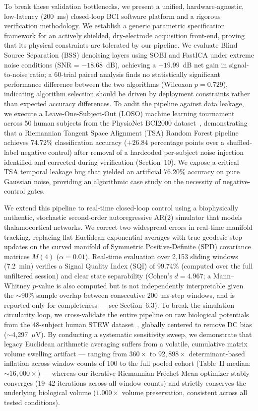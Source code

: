 \documentclass[11pt]{article}
\begin{document}
To break these validation bottlenecks, we present a unified, hardware-agnostic, low-latency (200~ms) closed-loop BCI software platform and a rigorous verification methodology. We establish a generic parametric specification framework for an actively shielded, dry-electrode acquisition front-end, proving that its physical constraints are tolerated by our pipeline. We evaluate Blind Source Separation (BSS) denoising layers using SOBI and FastICA under extreme noise conditions (SNR = $-18.68$~dB), achieving a $+19.99$~dB net gain in signal-to-noise ratio; a 60-trial paired analysis finds no statistically significant performance difference between the two algorithms (Wilcoxon $p = 0.729$), indicating algorithm selection should be driven by deployment constraints rather than expected accuracy differences. To audit the pipeline against data leakage, we execute a Leave-One-Subject-Out (LOSO) machine learning tournament across 50 human subjects from the PhysioNet BCI2000 dataset~\cite{schalk2004}, demonstrating that a Riemannian Tangent Space Alignment (TSA) Random Forest pipeline achieves 74.72\% classification accuracy ($+26.84$ percentage points over a shuffled-label negative control) after removal of a hardcoded per-subject noise injection identified and corrected during verification (Section~10). We expose a critical TSA temporal leakage bug that yielded an artificial 76.20\% accuracy on pure Gaussian noise, providing an algorithmic case study on the necessity of negative-control gates.

We extend this pipeline to real-time closed-loop control using a biophysically authentic, stochastic second-order autoregressive AR(2) simulator that models thalamocortical networks. We correct two widespread errors in real-time manifold tracking, replacing flat Euclidean exponential averages with true geodesic step updates on the curved manifold of Symmetric Positive-Definite (SPD) covariance matrices $M(4)$ ($\alpha = 0.01$). Real-time evaluation over 2,153 sliding windows (7.2~min) verifies a Signal Quality Index (SQI) of 99.74\% (computed over the full unfiltered session) and clear state separability (Cohen's $d = 4.967$; a Mann--Whitney $p$-value is also computed but is not independently interpretable given the $\sim$90\% sample overlap between consecutive 200~ms-step windows, and is reported only for completeness --- see Section~6.3). To break the simulation circularity loop, we cross-validate the entire pipeline on raw biological potentials from the 48-subject human STEW dataset~\cite{lim2018}, globally centered to remove DC bias ($\sim$4,297~$\mu$V). By conducting a systematic sensitivity sweep, we demonstrate that legacy Euclidean arithmetic averaging suffers from a volatile, cumulative matrix volume swelling artifact --- ranging from $360\times$ to $92{,}898\times$ determinant-based inflation across window counts of 100 to the full pooled cohort (Table~II median: $\sim16{,}000\times$) --- whereas our iterative Riemannian Fr\'echet Mean optimizer stably converges (19--42 iterations across all window counts) and strictly conserves the underlying biological volume ($1.000\times$ volume preservation, consistent across all tested conditions).
\end{document}
